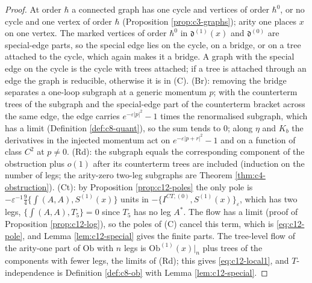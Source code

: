 \begin{proof}
At order $\hbar$ a connected graph has one cycle and vertices of order $\hbar^0$, or no cycle and one vertex of order $\hbar$ (Proposition \ref{prop:c3-graphs}); arity one places $x$ on one vertex. The marked vertices of order $\hbar^0$ in $\mathfrak d^{(1)}(x)$ and $\mathfrak d^{(0)}$ are special-edge parts, so the special edge lies on the cycle, on a bridge, or on a tree attached to the cycle, which again makes it a bridge. A graph with the special edge on the cycle is the cycle with trees attached; if a tree is attached through an edge the graph is reducible, otherwise it is in (C). (Br): removing the bridge separates a one-loop subgraph at a generic momentum $p$; with the counterterm trees of the subgraph and the special-edge part of the counterterm bracket across the same edge, the edge carries $e^{-\varepsilon|p|^2}-1$ times the renormalised subgraph, which has a limit (Definition \ref{def:c8-quant}), so the sum tends to $0$; along $\eta$ and $K_b$ the derivatives in the injected momentum act on $e^{-\varepsilon|p+r|^2}-1$ and on a function of class $C^2$ at $p\neq0$. (Rd): the subgraph equals the corresponding component of the obstruction plus $o(1)$ after its counterterm trees are included (induction on the number of legs; the arity-zero two-leg subgraphs are Theorem \ref{thm:c4-obstruction}). (Ct): by Proposition \ref{prop:c12-poles} the only pole is $-\varepsilon^{-1}\tfrac94\{\int(A,A),S^{(1)}(x)\}$ units in $-\{I^{CT,(0)},S^{(1)}(x)\}_\varepsilon$, which has two legs, $\{\int(A,A),T_5\}=0$ since $T_5$ has no leg $A^*$. The flow has a limit (proof of Proposition \ref{prop:c12-log}), so the poles of (C) cancel this term, which is \eqref{eq:c12-pole}, and Lemma \ref{lem:c12-special} gives the finite parts. The tree-level flow of the arity-one part of $\mathrm{Ob}$ with $n$ legs is $\mathrm{Ob}^{(1)}(x)|_n$ plus trees of the components with fewer legs, the limits of (Rd); this gives \eqref{eq:c12-local1}, and $T$-independence is Definition \ref{def:c8-ob} with Lemma \ref{lem:c12-special}.
\end{proof}

